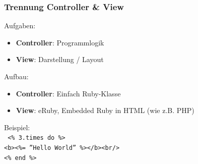 \begin{frame}
  \frametitle{Trennung Controller \& View}
  Aufgaben: \\
  \begin{itemize}
    \item {\bf Controller}: Programmlogik
    \item {\bf View}: Darstellung / Layout
  \end{itemize}

  Aufbau: \\
  \begin{itemize}
    \item {\bf Controller}: Einfach Ruby-Klasse
    \item {\bf View}: eRuby, Embedded Ruby in HTML (wie z.B. PHP)
  \end{itemize}
  Beispiel: \\
  \small \tt
  <\% 3.times do \%> \\
  \enskip <b><\%= ''Hello World'' \%></b><br/> \\
  <\% end \%>
\end{frame}

